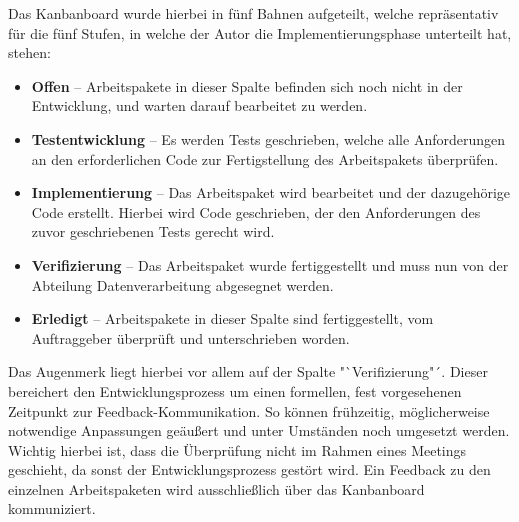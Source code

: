 Das Kanbanboard wurde hierbei in fünf Bahnen aufgeteilt, welche repräsentativ für
die fünf Stufen, in welche der Autor die Implementierungsphase unterteilt hat, stehen:
\begin{itemize}
    \item \textbf{Offen} -- Arbeitspakete in dieser Spalte befinden sich noch
    nicht in der Entwicklung, und warten darauf bearbeitet zu werden.
    \item \textbf{Testentwicklung} -- Es werden Tests geschrieben, welche alle
    Anforderungen an den erforderlichen Code zur Fertigstellung des Arbeitspakets
    überprüfen.
    \item \textbf{Implementierung} -- Das Arbeitspaket wird bearbeitet und der dazugehörige Code erstellt. Hierbei wird Code geschrieben, der den Anforderungen
    des zuvor geschriebenen Tests gerecht wird.
    \item \textbf{Verifizierung} -- Das Arbeitspaket wurde fertiggestellt und
    muss nun von der Abteilung Datenverarbeitung abgesegnet werden.
    \item \textbf{Erledigt} -- Arbeitspakete in dieser Spalte sind fertiggestellt,
    vom Auftraggeber überprüft und unterschrieben worden.
\end{itemize}

Das Augenmerk liegt hierbei vor allem auf der Spalte "`Verifizierung"´.
Dieser bereichert den Entwicklungsprozess um einen formellen, fest vorgesehenen
Zeitpunkt zur Feedback-Kommunikation. So können frühzeitig, möglicherweise notwendige Anpassungen geäußert und unter Umständen noch umgesetzt werden. Wichtig hierbei ist, dass die Überprüfung nicht im Rahmen eines Meetings geschieht, da sonst der Entwicklungsprozess gestört wird. Ein Feedback zu den einzelnen Arbeitspaketen wird ausschließlich über das Kanbanboard kommuniziert.\par

